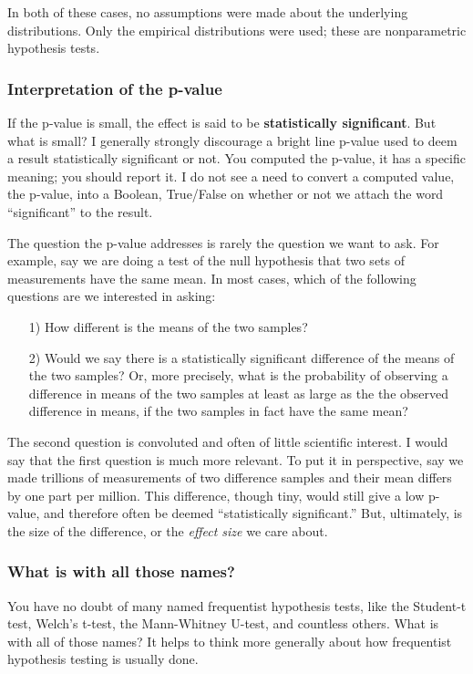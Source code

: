 In both of these cases, no assumptions were made about the underlying distributions. Only the empirical distributions were used; these are nonparametric hypothesis tests.

\subsubsection{Interpretation of the p-value}
If the p-value is small, the effect is said to be \textbf{statistically significant}. But what is small? I generally strongly discourage a bright line p-value used to deem a result statistically significant or not. You computed the p-value, it has a specific meaning; you should report it. I do not see a need to convert a computed value, the p-value, into a Boolean, True/False on whether or not we attach the word ``significant'' to the result.

The question the p-value addresses is rarely the question we want to ask. For example, say we are doing a test of the null hypothesis that two sets of measurements have the same mean. In most cases, which of the following questions are we interested in asking:
\begin{enumerate}
    \item[1)] How different is the means of the two samples?
    \item[2)] Would we say there is a statistically significant difference of the means of the two samples? Or, more precisely, what is the probability of observing a difference in means of the two samples at least as large as the the observed difference in means, if the two samples in fact have the same mean?
\end{enumerate}
The second question is convoluted and often of little scientific interest. I would say that the first question is much more relevant. To put it in perspective, say we made trillions of measurements of two difference samples and their mean differs by one part per million. This difference, though tiny, would still give a low p-value, and therefore often be deemed ``statistically significant.'' But, ultimately, is the size of the difference, or the \textit{effect size} we care about.

\subsubsection{What is with all those names?}
You have no doubt of many named frequentist hypothesis tests, like the Student-t test, Welch's t-test, the Mann-Whitney U-test, and countless others.  What is with all of those names?  It helps to think more generally about how frequentist hypothesis testing is usually done.

